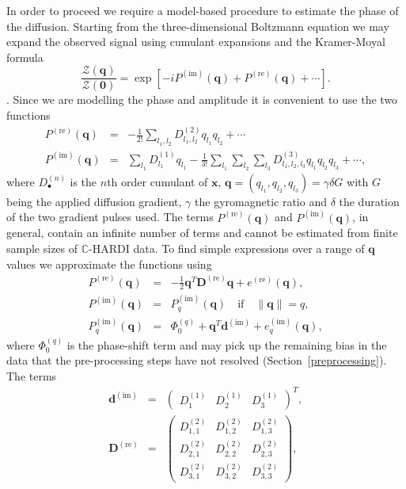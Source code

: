 \documentclass[authoryear,preprint,12pt]{elsarticle}
\newcommand{\re}{\text{re}}
\newcommand{\im}{\text{im}}
\newcommand{\bd}{\mathbf{d}}
\newcommand{\bD}{\mathbf{D}}
\newcommand{\q}{\mathbf{q}}
\newcommand{\x}{\mathbf{x}}
\newcommand{\bbC}{\mathbb{C}}
\newcommand{\cZ}{\mathcal{Z}}
\begin{document}
In order to proceed we require a model-based procedure to estimate the
phase of the diffusion.  Starting from the three-dimensional Boltzmann
equation we may expand the observed signal using cumulant expansions
and the Kramer-Moyal formula 
\begin{equation}\label{kramermoyal}
  \frac{\cZ(\q)}{\cZ({\mathbf{0}})} = \exp\left[-iP^{(\im)}(\q) +
  P^{(\re)}(\q) + \cdots \right].
\end{equation}
\citep{Callaghan,Liu2004,Liu2005}.  Since we are modelling the phase
and amplitude it is convenient to use the two functions
\begin{eqnarray}
  P^{(\re)}(\q) &=& -\frac{1}{2!}\sum_{l_1,l_2} D^{(2)}_{l_1,l_2}
  q_{l_1}q_{l_2} + \cdots\\ 
  P^{(\im)}(\q) &=& \sum_{l_1} D^{(1)}_{l_1} q_{l_1} - \frac{1}{3!}
  \sum_{l_1}\sum_{l_2}\sum_{l_3} D^{(3)}_{l_1,l_2,l_3} q_{l_1} q_{l_2}
  q_{l_3} + \cdots,
\end{eqnarray}
where $D^{(n)}_{\bullet}$ is the $n$th order cumulant of $\x$,
$\q=(q_{l_1},q_{l_2},q_{l_3})=\gamma\delta{G}$ with $G$ being the
applied diffusion gradient, $\gamma$ the gyromagnetic ratio and
$\delta$ the duration of the two gradient pulses used.  The terms
$P^{(\re)}(\q)$ and $P^{(\im)}(\q)$, in general, contain an infinite
number of terms and cannot be estimated from finite sample sizes of
$\bbC$-HARDI data.  To find simple expressions over a range of $\q$
values we approximate the functions using
\begin{eqnarray}
  P^{(\re)}(\q) &=& -\frac{1}{2} \q^T\bD^{(\re)}\q + e^{(\re)}(\q),\\
  P^{(\im)}(\q) &=& P^{(\im)}_q(\q) \quad \text{if} \quad \|\q\|=q,\\
  \label{taylor:phase2}
  P^{(\im)}_q(\q) &=& \Phi_0^{(q)} + \q^T\bd^{(\im)} + e^{(\im)}_q(\q),
\end{eqnarray}
where $\Phi_0^{(q)}$ is the phase-shift term and may pick up the
remaining bias in the data that the pre-processing steps have not
resolved (Section~\ref{preprocessing}).  The terms
\begin{eqnarray}
  \label{eqn:dim}
  \bd^{(\im)} &=& \begin{pmatrix}
    D^{(1)}_{1} & D^{(1)}_{2} & D^{(1)}_{3}
  \end{pmatrix}^T,\\
  \label{eqn:Dre}
  \bD^{(\re)} &=& \begin{pmatrix}
    D_{1,1}^{(2)} & D_{1,2}^{(2)} & D_{1,3}^{(2)}\\
    D_{2,1}^{(2)} & D_{2,2}^{(2)} & D_{2,3}^{(2)}\\
    D_{3,1}^{(2)} & D_{3,2}^{(2)} & D_{3,3}^{(2)}
  \end{pmatrix},
\end{eqnarray}
\end{document}
